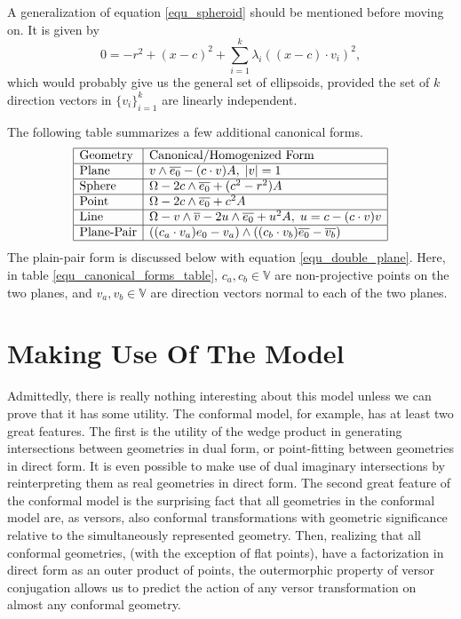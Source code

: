 \documentclass{birkjour}
\theoremstyle{definition}
\theoremstyle{remark}
\numberwithin{equation}{section}
\newcommand{\V}{\mathbb{V}}
\begin{document}
A generalization of equation \eqref{equ_spheroid} should be mentioned
before moving on.  It is given by
\begin{equation}
0 = -r^2 + (x-c)^2 + \sum_{i=1}^k \lambda_i((x-c)\cdot v_i)^2,
\end{equation}
which would probably give us the general set of ellipsoids, provided
the set of $k$ direction vectors in $\{v_i\}_{i=1}^k$ are
linearly independent.

The following table summarizes a few additional canonical forms.
\begin{equation}\label{equ_canonical_forms_table}
\begin{array}{|l|l|}
\hline
\mbox{Geometry} & \mbox{Canonical/Homogenized Form} \\
\hline
\mbox{Plane} & v\wedge\overline{e_0} - (c\cdot v)A,\;|v|=1 \\
\hline
\mbox{Sphere} & \Omega - 2c\wedge\overline{e_0} + (c^2-r^2)A \\
\hline
\mbox{Point} & \Omega - 2c\wedge\overline{e_0} + c^2A \\
\hline
\mbox{Line} & \Omega - v\wedge\overline{v} - 2u\wedge\overline{e_0} + u^2A,\;u=c-(c\cdot v)v \\
\hline
\mbox{Plane-Pair} & ((c_a\cdot v_a)e_0-v_a)\wedge((c_b\cdot v_b)\overline{e_0}-\overline{v_b}) \\
\hline
\end{array}
\end{equation}
The plain-pair form is discussed below with equation \eqref{equ_double_plane}.  Here,
in table \eqref{equ_canonical_forms_table}, $c_a,c_b\in\V$ are non-projective points
on the two planes, and $v_a,v_b\in\V$ are direction vectors normal to each of the two planes.

\section{Making Use Of The Model}

Admittedly, there is really nothing interesting about this model unless we can
prove that it has some utility.  The conformal model, for example, has at least
two great features.  The first is the utility of the wedge product in generating
intersections between geometries in dual form, or point-fitting between
geometries in direct form.  It is even possible to
make use of dual imaginary intersections by reinterpreting them as real geometries
in direct form.  The second great feature of the conformal model is the
surprising fact that all geometries in the conformal model are, as versors, also conformal transformations
with geometric significance relative to the simultaneously represented geometry.
Then, realizing that all conformal geometries, (with the exception of flat points), have
a factorization in direct form as an outer product of points, the outermorphic
property of versor conjugation allows us to predict the action of any versor
transformation on almost any conformal geometry.
\end{document}
